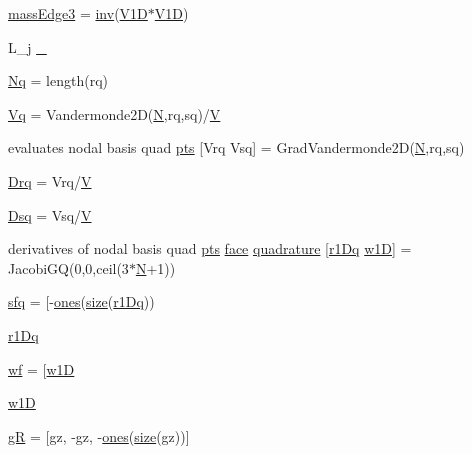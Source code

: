 \begin{DoxyCompactItemize}
\item 
\hyperlink{a00473_af00cee47bb233fdc11ecc42cf3eff646}{mass\+Edge3} = \hyperlink{a00473_a0c752aad07d6c7e22d2e63df41ccdf8b}{inv}(\hyperlink{a00473_a015213f82f9dfc2bc247c0778f3bc120}{V1D}$\ast$\hyperlink{a00473_a015213f82f9dfc2bc247c0778f3bc120}{V1D}\textquotesingle{})
\item 
L\+\_\+j \hyperlink{a00473_a7d15a4f6e76dff66c5b4314123b32e0d}{\+\_\+}
\item 
\hyperlink{a00473_a5613c6c6f438049d9d5464468692715a}{Nq} = length(rq)
\item 
\hyperlink{a00473_a6d762c2c00824e501e0b1336e38cd878}{Vq} = Vandermonde2D(\hyperlink{a00473_a5b9c4563028063ee53b517cce9aa701b}{N},rq,sq)/\hyperlink{a00575_af658e24e5ad7935911c432c5c02d895c}{V}
\item 
evaluates nodal basis quad \hyperlink{a00473_a7d2fb616b76863109aa80a7ffdfad72b}{pts} \mbox{[}Vrq Vsq\mbox{]} = Grad\+Vandermonde2D(\hyperlink{a00473_a5b9c4563028063ee53b517cce9aa701b}{N},rq,sq)
\item 
\hyperlink{a00473_a0860e58b8f4010af9aa55717745c4b9d}{Drq} = Vrq/\hyperlink{a00575_af658e24e5ad7935911c432c5c02d895c}{V}
\item 
\hyperlink{a00473_a90f04ab0b3b4b834efda241ab283fc57}{Dsq} = Vsq/\hyperlink{a00575_af658e24e5ad7935911c432c5c02d895c}{V}
\item 
derivatives of nodal basis quad \hyperlink{a00473_a7d2fb616b76863109aa80a7ffdfad72b}{pts} \hyperlink{a00611_ac4ec0037ba529da25bf084669a45f60c}{face} \hyperlink{a00473_ac3595844f3ad3881eaa91da23069d5eb}{quadrature} \mbox{[}\hyperlink{a00473_a79d685dcbb9027705142b2a8b912aa1e}{r1\+Dq} \hyperlink{a00473_aa7de090b80d0a88d7d94e7763da3fe7e}{w1D}\mbox{]} = Jacobi\+GQ(0,0,ceil(3$\ast$\hyperlink{a00473_a5b9c4563028063ee53b517cce9aa701b}{N}+1))
\item 
\hyperlink{a00473_af5555ce3d578203ae1f6d0731e4f1170}{sfq} = \mbox{[}-\/\hyperlink{a00473_a6d4fbbd46e46569dab2b0ad8372e0220}{ones}(\hyperlink{a00611_ad6cb0afbbe6ea4f56407890be2533966}{size}(\hyperlink{a00473_a79d685dcbb9027705142b2a8b912aa1e}{r1\+Dq}))
\item 
\hyperlink{a00473_aed0fb0ce4332da27d943a566abf0bdb7}{r1\+Dq}
\item 
\hyperlink{a00473_a7bb9d681a4df47c616b79d82759cd0e6}{wf} = \mbox{[}\hyperlink{a00473_aa7de090b80d0a88d7d94e7763da3fe7e}{w1D}
\item 
\hyperlink{a00473_aa7de090b80d0a88d7d94e7763da3fe7e}{w1D}
\item 
\hyperlink{a00473_acbf1a23eea93c85cd113589566865e49}{gR} = \mbox{[}gz, -\/gz, -\/\hyperlink{a00473_a6d4fbbd46e46569dab2b0ad8372e0220}{ones}(\hyperlink{a00611_ad6cb0afbbe6ea4f56407890be2533966}{size}(gz))\mbox{]}

\end{DoxyCompactItemize}
